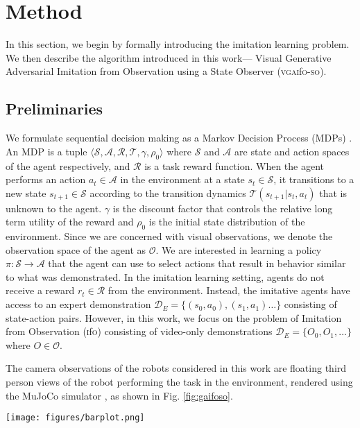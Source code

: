 \documentclass[letterpaper, 10 pt, conference]{ieeeconf}  %
\newcommand{\gaifo}{\textsc{gai}f\textsc{o}}
\newcommand{\ifo}{\textsc{i}f\textsc{o}}
\newcommand{\vgaifo}{\textsc{vgai}f\textsc{o}}
\newcommand{\vgaifoso}{\textsc{vgai}f\textsc{o}-\textsc{so}}
\newcommand{\tcn}{\textsc{tcn}}
\begin{document}
\section{Method}
\label{sec:background}
In this section, we begin by formally introducing the imitation learning problem. We then describe the algorithm introduced in this work--- Visual Generative Adversarial Imitation from Observation using a State Observer (\vgaifoso{}). 

\subsection{Preliminaries}
We formulate sequential decision making as a Markov Decision Process (MDPs) \cite{suttonandbarto}. An MDP is a tuple $\langle \mathcal{S}, \mathcal{A}, \mathcal{R}, \mathcal{T}, \gamma, \rho_0 \rangle$ where $\mathcal{S}$ and $\mathcal{A}$ are state and action spaces of the agent respectively, and $\mathcal{R}$ is a task reward function. When the agent performs an action $a_t \in \mathcal{A}$ in the environment at a state $s_t \in \mathcal{S}$, it transitions to a new state $s_{t+1} \in \mathcal{S}$ according to the transition dynamics $\mathcal{T}(s_{t+1} | s_t, a_t)$ that is unknown to the agent. $\gamma$ is the discount factor that controls the relative long term utility of the reward and $\rho_0$ is the initial state distribution of the environment. Since we are concerned with visual observations, we denote the observation space of the agent as $\mathcal{O}$. We are interested in learning a policy $\pi : \mathcal{S} \rightarrow \mathcal{A}$ that the agent can use to select actions that result in behavior similar to what was demonstrated. In the imitation learning setting, agents do not receive a reward $r_t \in \mathcal{R}$ from the environment. Instead, the imitative agents have access to an expert demonstration $\mathcal{D}_E=\{(s_0, a_0), (s_1, a_1) \ldots\}$ consisting of state-action pairs. However, in this work, we focus on the problem of Imitation from Observation (\ifo{}) consisting of video-only demonstrations $\mathcal{D}_E=\{O_0, O_1, \ldots\}$ where $O \in \mathcal{O}$.

The camera observations of the robots considered in this work are floating third person views of the robot performing the task in the environment, rendered using the MuJoCo simulator \cite{mujoco, openai}, as shown in Fig. \ref{fig:gaifoso}. 

\begin{figure*}
	\centering
	\texttt{[image: figures/barplot.png]}
	\caption{Performance of different \ifo{} algorithms with varied numbers of expert demonstration trajectories, trained for two million timesteps of interaction with the environment. We see that \gaifo{} \cite{gaifo} performs the best due to its privileged access to expert's proprioceptive state information. \vgaifoso{}, the algorithm introduced in this work, outperforms \vgaifo{} \cite{gaifo_proprio} and \tcn{} \cite{tcn} on all six environments and achieves performance similar to \gaifo{} in \textit{InvertedPendulum}, \textit{InvertedDoublePendulum} and \textit{Hopper}, without access to the expert's true proprioceptive states.}
	\label{fig:barplots}
\end{figure*}
\end{document}
